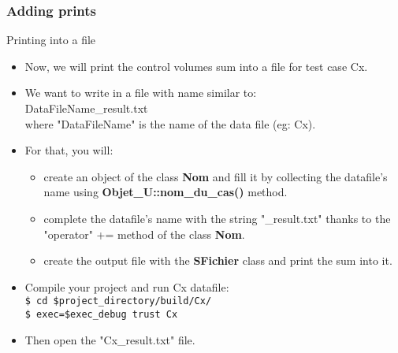 \documentclass[10pt, hyperref={unicode=true,pdfusetitle, bookmarks=true,bookmarksnumbered=false,bookmarksopen=false, breaklinks=false,pdfborder={0 0 1},backref=true,colorlinks=true,linkcolor=darkblue,pageanchor, urlcolor=darkblue}]{beamer}
\begin{document}
\begin{frame}
\frametitle{Adding prints}
\begin{block}{Printing into a file}

\begin{itemize}

\item Now, we will print the control volumes sum into a file for test case Cx. 

\item We want to write in a file with name similar to: \\
DataFileName\_result.txt \\
where "DataFileName" is the name of the data file (eg: Cx).

\item For that, you will:
\begin{itemize}
\item  create an object of the class \textbf{Nom} and fill it by collecting the datafile's name using \textbf{Objet\_U::nom\_du\_cas()} method.
\item complete the datafile's name with the string "\_result.txt" thanks to the "operator" += method of the class \textbf{Nom}.
\item create the output file with the \textbf{SFichier} class and print the sum into it.
\end{itemize}
\item Compile your project and run Cx datafile: \\
\texttt{\$ cd \$project\_directory/build/Cx/}\\
\texttt{\$ exec=\$exec\_debug trust Cx}
\item Then open the "Cx\_result.txt" file.
\end{itemize}

\end{block}
\end{frame}

\end{document}
